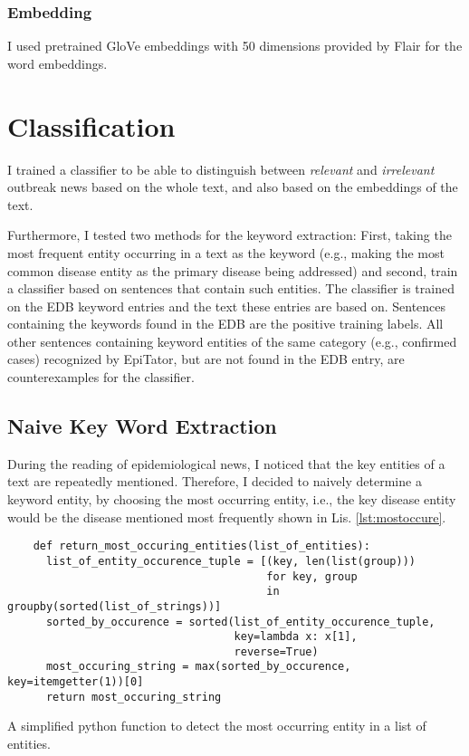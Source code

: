 \subsubsection{Embedding}
I used pretrained GloVe embeddings with 50 dimensions provided by Flair for the word embeddings.

\section{Classification}
I trained a classifier to be able to distinguish between \emph{relevant} and \emph{irrelevant} outbreak news based on the whole text, and also based on the embeddings of the text.

Furthermore, I tested two methods for the keyword extraction: First, taking the most frequent entity occurring in a text as the keyword (e.g., making the most common disease entity as the primary disease being addressed) and second, train a classifier based on sentences that contain such entities. The classifier is trained on the EDB keyword entries and the text these entries are based on.
Sentences containing the keywords found in the EDB are the positive training labels.
All other sentences containing keyword entities of the same category (e.g., confirmed cases) recognized by EpiTator, but are not found in the EDB entry, are counterexamples for the classifier.

\subsection{Naive Key Word Extraction}
During the reading of epidemiological news, I noticed that the key entities of a text are repeatedly mentioned. Therefore, I decided to naively determine a keyword entity, by choosing the most occurring entity, i.e., the key disease entity would be the disease mentioned most frequently shown in Lis. \ref{lst:mostoccure}.
\begin{listing}[h!]
  \begin{verbatim}
    def return_most_occuring_entities(list_of_entities):
      list_of_entity_occurence_tuple = [(key, len(list(group)))
                                        for key, group
                                        in groupby(sorted(list_of_strings))]
      sorted_by_occurence = sorted(list_of_entity_occurence_tuple,
                                   key=lambda x: x[1],
                                   reverse=True)
      most_occuring_string = max(sorted_by_occurence, key=itemgetter(1))[0]
      return most_occuring_string
  \end{verbatim}
  \caption{A simplified python function to detect the most occurring entity in a list of entities.}
  \label{lst:mostoccure}
\end{listing}


